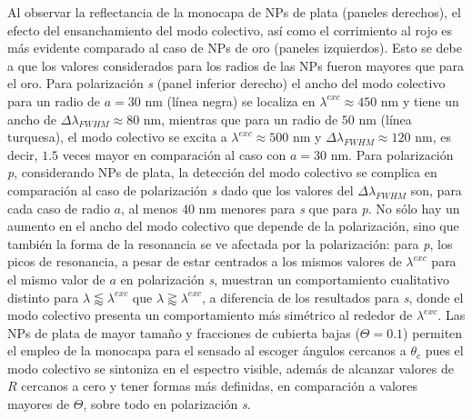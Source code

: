 Al observar la reflectancia de la monocapa de NPs de plata  (paneles derechos), el efecto del ensanchamiento del modo colectivo, así como el corrimiento al rojo es más evidente comparado al caso de NPs de oro (paneles izquierdos). Esto se debe a  que los valores considerados para los radios de las NPs fueron mayores que para el oro. Para polarización \emph{s} (panel inferior derecho) el ancho del modo colectivo para un radio de $a=30$ nm (línea negra) se localiza en $\lambda^{exc}\approx 450$ nm y tiene un ancho de $\Delta\lambda_{FWHM}\approx 80$ nm, mientras que para un radio de $50$ nm (línea turquesa), el modo colectivo se excita a $\lambda^{exc}\approx 500$ nm y $\Delta\lambda_{FWHM}\approx 120$ nm, es decir, $1.5$ veces mayor en comparación al caso con $a=30$ nm. Para polarización \emph{p}, considerando NPs de plata, la detección del modo colectivo se complica en comparación al caso de polarización \emph{s} dado que los valores del $\Delta\lambda_{FWHM}$ son, para cada caso de radio $a$, al menos $40$ nm menores para \emph{s} que para \emph{p}. No sólo hay un aumento en el ancho del modo colectivo que depende de la polarización, sino que también la forma de la resonancia se ve afectada por la polarización: para \emph{p}, los picos de resonancia, a pesar de estar centrados a los mismos valores de $\lambda^{exc}$ para el mismo valor de $a$ en polarización \emph{s},  muestran un comportamiento cualitativo distinto para $\lambda\lessapprox\lambda^{exc}$ que $\lambda\gtrapprox\lambda^{exc}$, a diferencia de los resultados para \emph{s}, donde el modo colectivo presenta un comportamiento más simétrico al rededor de $\lambda^{exc}$. Las NPs de plata de mayor tamaño y fracciones de cubierta bajas ($\Theta= 0.1$) permiten el empleo de la monocapa para el sensado al escoger ángulos cercanos a $\theta_c$ pues el modo colectivo se sintoniza en el espectro visible, además de alcanzar valores de $R$ cercanos a cero y tener formas más definidas, en comparación a valores mayores de $\Theta$, sobre todo en polarización \emph{s}.


